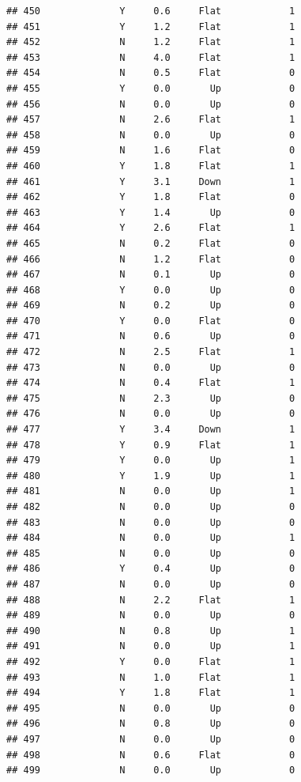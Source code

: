 \documentclass[
]{article}
\begin{document}
\begin{verbatim}
## 450              Y     0.6     Flat            1
## 451              Y     1.2     Flat            1
## 452              N     1.2     Flat            1
## 453              N     4.0     Flat            1
## 454              N     0.5     Flat            0
## 455              Y     0.0       Up            0
## 456              N     0.0       Up            0
## 457              N     2.6     Flat            1
## 458              N     0.0       Up            0
## 459              N     1.6     Flat            0
## 460              Y     1.8     Flat            1
## 461              Y     3.1     Down            1
## 462              Y     1.8     Flat            0
## 463              Y     1.4       Up            0
## 464              Y     2.6     Flat            1
## 465              N     0.2     Flat            0
## 466              N     1.2     Flat            0
## 467              N     0.1       Up            0
## 468              Y     0.0       Up            0
## 469              N     0.2       Up            0
## 470              Y     0.0     Flat            0
## 471              N     0.6       Up            0
## 472              N     2.5     Flat            1
## 473              N     0.0       Up            0
## 474              N     0.4     Flat            1
## 475              N     2.3       Up            0
## 476              N     0.0       Up            0
## 477              Y     3.4     Down            1
## 478              Y     0.9     Flat            1
## 479              Y     0.0       Up            1
## 480              Y     1.9       Up            1
## 481              N     0.0       Up            1
## 482              N     0.0       Up            0
## 483              N     0.0       Up            0
## 484              N     0.0       Up            1
## 485              N     0.0       Up            0
## 486              Y     0.4       Up            0
## 487              N     0.0       Up            0
## 488              N     2.2     Flat            1
## 489              N     0.0       Up            0
## 490              N     0.8       Up            1
## 491              N     0.0       Up            1
## 492              Y     0.0     Flat            1
## 493              N     1.0     Flat            1
## 494              Y     1.8     Flat            1
## 495              N     0.0       Up            0
## 496              N     0.8       Up            0
## 497              N     0.0       Up            0
## 498              N     0.6     Flat            0
## 499              N     0.0       Up            0

\end{verbatim}
\end{document}

